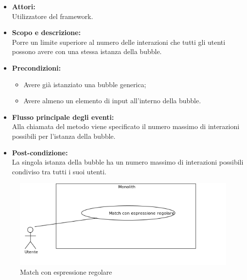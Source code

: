 \begin{itemize}
	\item \textbf{Attori:}
	\\Utilizzatore del framework.
	\item \textbf{Scopo e descrizione:} 
	\\Porre un limite superiore al numero delle interazioni che tutti gli utenti possono avere con una stessa istanza della bubble.
	\item \textbf{Precondizioni:}
	\begin{itemize}
		\item Avere già istanziato una bubble generica;
		\item Avere almeno un elemento di input all'interno della bubble.
	\end{itemize}
	\item \textbf{Flusso principale degli eventi:}
	\\Alla chiamata del metodo viene specificato il numero massimo di interazioni possibili per l'istanza della bubble.
	\item \textbf{Post-condizione:}
	\\La singola istanza della bubble ha un numero massimo di interazioni possibili condiviso tra tutti i suoi utenti. 
\end{itemize}


\begin{figure}[H]
	\centering
	\includegraphics[width=15cm]{../../documenti/AnalisiDeiRequisiti/Diagrammi_img/uc1_10.png}
	\caption{\UCCaption{} Match con espressione regolare}
\end{figure}

